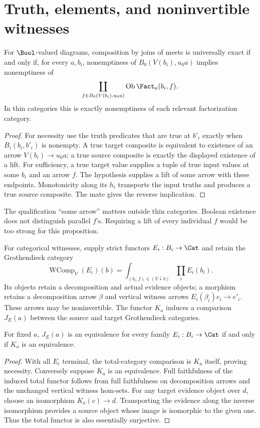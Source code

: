\section{Truth, elements, and noninvertible witnesses}
\begin{proposition}
For $\Bool$-valued diagrams, composition by joins of meets is universally
exact if and only if, for every $a,b_i$, nonemptiness of
$B_0(V(b_i),u_0a)$ implies nonemptiness of
\[
 \coprod_{f\in B_0(V(b_i),u_0a)}\operatorname{Ob}\Fact_a(b_i,f).
\]
In thin categories this is exactly nonemptiness of each relevant
factorization category.
\end{proposition}
\begin{proof}
For necessity use the truth predicates that are true at $b'_i$ exactly
when $B_i(b_i,b'_i)$ is nonempty. A true target composite is equivalent
to existence of an arrow $V(b_i)\to u_0a$; a true source composite
is exactly the displayed existence of a lift. For sufficiency, a true
target value supplies a tuple of true input values at some $b_i$ and an
arrow $f$. The hypothesis supplies a lift of some arrow with these
endpoints. Monotonicity along its $h_i$ transports the input truths and
produces a true source composite. The mate gives the reverse implication.
\end{proof}

The qualification ``some arrow'' matters outside thin categories. Boolean
existence does not distinguish parallel $f$'s. Requiring a lift of every
individual $f$ would be too strong for this proposition.

For categorical witnesses, supply strict functors $E_i:B_i\to\Cat$ and
retain the Grothendieck category
\[
 \operatorname{WComp}_V(E_i)(b)
   =\int_{(b_i,f)\in(V\downarrow b)}\prod_iE_i(b_i).
\]
Its objects retain a decomposition and actual evidence objects; a morphism
retains a decomposition arrow $\beta$ and vertical witness arrows
$E_i(\beta_i)e_i\to e'_i$. These arrows may be noninvertible. The
functor $K_a$ induces a comparison $J_E(a)$ between the source and target
Grothendieck categories.

\begin{theorem}\label{thm:witness}
For fixed $a$, $J_E(a)$ is an equivalence for every family
$E_i:B_i\to\Cat$ if and only if $K_a$ is an equivalence.
\end{theorem}
\begin{proof}
With all $E_i$ terminal, the total-category comparison is $K_a$ itself,
proving necessity. Conversely suppose $K_a$ is an equivalence. Full
faithfulness of the induced total functor follows from full faithfulness
on decomposition arrows and the unchanged vertical witness hom-sets.
For any target evidence object over $d$, choose an isomorphism
$K_a(c)\to d$. Transporting the evidence along the inverse isomorphism
provides a source object whose image is isomorphic to the given one.
Thus the total functor is also essentially surjective.
\end{proof}

